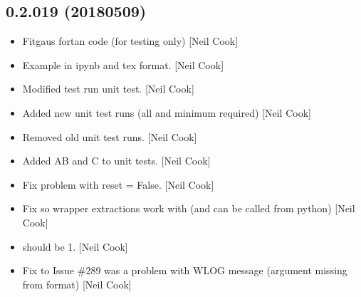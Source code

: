 \documentclass[a4paper,10pt,english]{report}
\begin{document}
\subsection{0.2.019 (2018\sphinxhyphen{}05\sphinxhyphen{}09)}
\label{\detokenize{misc/changelog:id460}}\begin{itemize}
\item {} 
Fitgaus fortan code (for testing only) {[}Neil Cook{]}

\item {} 
Example in ipynb and tex format. {[}Neil Cook{]}

\item {} 
Modified test run unit test. {[}Neil Cook{]}

\item {} 
Added new unit test runs (all and minimum required) {[}Neil Cook{]}

\item {} 
Removed old unit test runs. {[}Neil Cook{]}

\item {} 
Added  AB and C to unit tests. {[}Neil Cook{]}

\item {} 
Fix problem with reset = False. {[}Neil Cook{]}

\item {} 
Fix so wrapper extractions work with  (and can be called
from python) {[}Neil Cook{]}

\item {} 
 should be \sphinxhyphen{}1. {[}Neil Cook{]}

\item {} 
Fix to Issue \#289 \sphinxhyphen{} was a problem with WLOG message (argument missing
from format) {[}Neil Cook{]}

\end{itemize}
\end{document}
